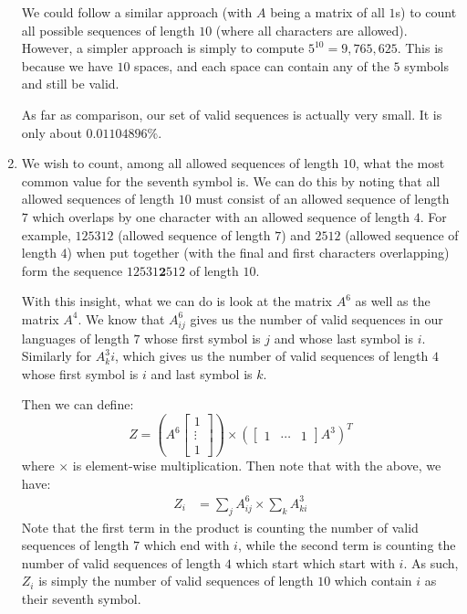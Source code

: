 \documentclass[12pt]{exam}
\begin{document}
\begin{questions}
\begin{solution}
\begin{enumerate}[label=(\alph*)]
      We could follow a similar approach (with $A$ being a matrix of all $1$s) to count all possible sequences of length $10$ (where all characters are allowed). However, a simpler approach is simply to compute $5^{10} = 9,765,625$. This is because we have $10$ spaces, and each space can contain any of the $5$ symbols and still be valid.

      As far as comparison, our set of valid sequences is actually very small. It is only about $0.01104896\%$.

    \item
      We wish to count, among all allowed sequences of length $10$, what the most common value for the seventh symbol is. We can do this by noting that all allowed sequences of length $10$ must consist of an allowed sequence of length $7$ which overlaps by one character with an allowed sequence of length $4$. For example, $125312$ (allowed sequence of length $7$) and $2512$ (allowed sequence of length $4$) when put together (with the final and first characters overlapping) form the sequence $12531\textbf{2}512$ of length $10$.

      With this insight, what we can do is look at the matrix $A^6$ as well as the matrix $A^4$. We know that $A^6_{ij}$ gives us the number of valid sequences in our languages of length $7$ whose first symbol is $j$ and whose last symbol is $i$. Similarly for $A^3_ki$, which gives us the number of valid sequences of length $4$ whose first symbol is $i$ and last symbol is $k$.

      Then we can define:
      $$
        Z = \left(A^6  \begin{bmatrix} 1 \\ \vdots \\ 1\end{bmatrix}\right) \times \left(\begin{bmatrix} 1 & \cdots & 1 \end{bmatrix} A^3\right)^T
      $$
      where $\times$ is element-wise multiplication.
      Then note that with the above, we have:
      \begin{align*}
        Z_i &= \sum_{j} A^6_{ij} \times  \sum_{k} A^3_{ki}
      \end{align*}
      Note that the first term in the product is counting the number of valid sequences of length $7$ which end with $i$, while the second term is counting the number of valid sequences of length $4$ which start which start with $i$. As such, $Z_i$ is simply the number of valid sequences of length $10$ which contain $i$ as their seventh symbol.


\end{enumerate}
\end{solution}
\end{questions}
\end{document}
